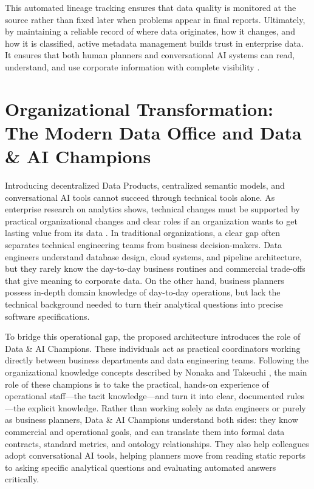 This automated lineage tracking ensures that data quality is monitored at the source rather than fixed later when problems appear in final reports. 
Ultimately, by maintaining a reliable record of where data originates, how it changes, and how it is classified, active metadata management builds trust in enterprise data. 
It ensures that both human planners and conversational AI systems can read, understand, and use corporate information with complete visibility \cite{borgman2015big, dama2024dmbok}.


\section[Organizational Transformation]{Organizational Transformation: The Modern Data Office and Data \& AI Champions}
\label{sec:organizational_transformation}

Introducing decentralized Data Products, centralized semantic models, and conversational AI tools cannot succeed through technical tools alone. 
As enterprise research on analytics shows, technical changes must be supported by practical organizational changes and clear roles if an organization wants to get lasting value 
from its data \cite{davenport2017competing}. 
In traditional organizations, a clear gap often separates technical engineering teams from business decision-makers. 
Data engineers understand database design, cloud systems, and pipeline architecture, but they rarely know the day-to-day business routines and commercial trade-offs 
that give meaning to corporate data. On the other hand, business planners possess in-depth domain knowledge of day-to-day operations, but lack the technical background needed to turn their 
analytical questions into precise software specifications.

To bridge this operational gap, the proposed architecture introduces the role of Data \& AI Champions. These individuals act as practical coordinators working directly 
between business departments and data engineering teams. Following the organizational knowledge concepts described by Nonaka and Takeuchi \cite{nonaka1995knowledge}, 
the main role of these champions is to take the practical, hands-on experience of operational staff---the tacit knowledge---and turn it into clear, documented rules
---the explicit knowledge. Rather than working solely as data engineers or purely as business planners, Data \& AI Champions understand both sides: 
they know commercial and operational goals, and can translate them into formal data contracts, standard metrics, and ontology relationships. 
They also help colleagues adopt conversational AI tools, helping planners move from reading static reports to asking specific analytical questions and evaluating automated 
answers critically.

